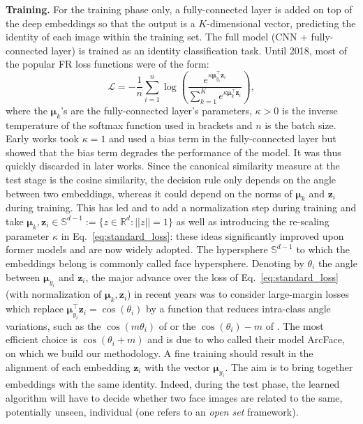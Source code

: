 \documentclass[nohyperref]{article}
\theoremstyle{plain}
\theoremstyle{definition}
\theoremstyle{remark}
\newcommand{\vect}[1]{{\bm{#1}}}
\begin{document}
{\bf Training.} For the training phase only, a fully-connected layer is added on top of the deep embeddings so that the output is a $K$-dimensional vector, predicting the identity of each image within the training set. The full model (CNN + fully-connected layer) is trained as an identity classification task. Until 2018, most of the popular FR loss functions were of the form:
\begin{equation} \label{eq:standard_loss}
\mathcal{L} = - \frac{1}{n} \sum\limits_{i=1}^n \log \left( \frac{e^{ \kappa \vect{\mu}_{y_i}^\intercal \vect{z}_i}}{\sum_{k=1}^K e^{ \kappa \vect{\mu}_{k}^\intercal \vect{z}_i}} \right),
\end{equation} 
where the $\vect{\mu}_k$'s are the fully-connected layer's parameters, $\kappa > 0$ is the inverse temperature of the softmax function used in brackets and $n$ is the batch size. Early works \cite{deepface,deepID} took $\kappa = 1$ and used a bias term in the fully-connected layer but \cite{normface} showed that the bias term degrades the performance of the model. It was thus quickly discarded in later works. 
Since the canonical similarity measure at the test stage is the cosine similarity, the decision rule only depends on the angle between two embeddings, whereas it could depend on the norms of $\vect{\mu}_k$ and $\vect{z}_i$ during training. This has led \cite{normface} and \cite{vmf_deep_learning} to add a normalization step during training and take $\vect{\mu}_k, \vect{z}_i \in \mathbb{S}^{d-1}:=\{ z \in \mathbb{R}^d: ||z|| = 1\}$ as well as introducing the re-scaling parameter $\kappa$ in Eq.~\ref{eq:standard_loss}: these ideas significantly improved upon former models and are now widely adopted. The hypersphere $\mathbb{S}^{d-1}$ to which the embeddings belong is commonly called face hypersphere.
Denoting by $\theta_{i}$ the angle between $\vect{\mu}_{y_i}$ and $\vect{z}_i$, the major advance over the loss of Eq.~\ref{eq:standard_loss} (with normalization of $\vect{\mu}_k, \vect{z}_i$) in recent years was to consider large-margin losses which replace $\vect{\mu}_{{y_i}}^\intercal \vect{z}_i = \cos(\theta_{i})$ by a function that reduces intra-class angle variations, such as the $\cos(m \theta_{i})$ of \cite{sphereface} or the $\cos(\theta_{i})-m$ of \cite{cosface}. The most efficient choice is $\cos(\theta_{i} + m)$ and is due to \cite{arcface} who called their model ArcFace, on which we build our methodology. A fine training should result in the alignment of each embedding $\vect{z}_i$ with the vector $\vect{\mu}_{y_i}$. The aim is to bring together embeddings with the same identity. Indeed, during the test phase, the learned algorithm will have to decide whether two face images are related to the same, potentially unseen, individual (one refers to an {\it open set} framework).
\end{document}
